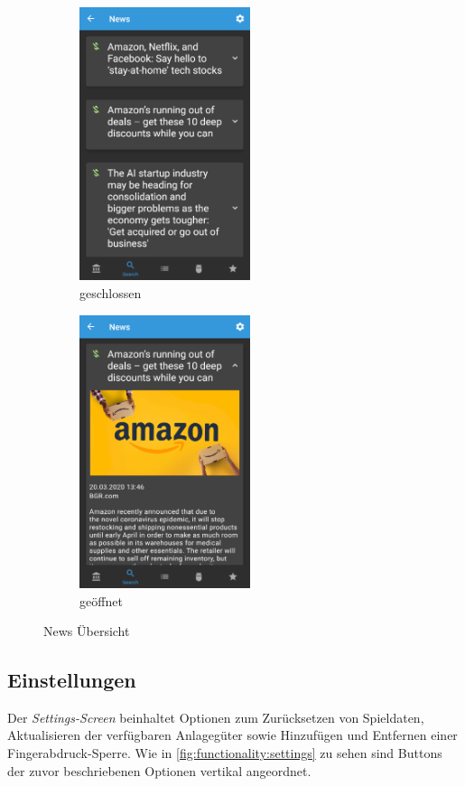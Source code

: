 \documentclass[a4paper]{article}
\begin{document}
\begin{figure}[H]
    \begin{subfigure}{.5\textwidth}
        \centering
        \includegraphics[height=8cm,keepaspectratio]{./images/news/news.png}
        \caption{geschlossen}
        \label{fig:functionality:news:closed}
    \end{subfigure}
    \begin{subfigure}{.5\textwidth}
        \centering
        \includegraphics[height=8cm,keepaspectratio]{./images/news/news_open.png}
        \caption{geöffnet}
        \label{fig:functionality:news:open}
    \end{subfigure}
    \caption{News Übersicht}
    \label{fig:functionality:news}
\end{figure}


\subsection{Einstellungen}
\label{subsec:functionality:settings}
Der \textit{Settings-Screen} beinhaltet Optionen zum Zurücksetzen von Spieldaten, Aktualisieren der verfügbaren Anlagegüter sowie Hinzufügen und Entfernen einer Fingerabdruck-Sperre.
Wie in \autoref{fig:functionality:settings} zu sehen sind Buttons der zuvor beschriebenen Optionen vertikal angeordnet.
\end{document}
